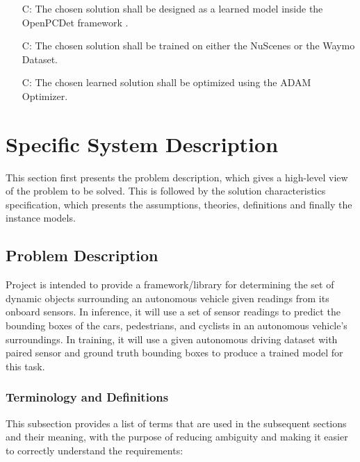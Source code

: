 \documentclass[12pt]{article}
\newcounter{consnum} %
\begin{document}
\noindent \begin{itemize}
\item[C\refstepcounter{consnum}\theconsnum\label{C1}:] The chosen solution shall be designed as a learned model inside the OpenPCDet framework \cite{openpcdet2020}. 

\item[C\refstepcounter{consnum}\theconsnum\label{C2}:] The chosen solution shall be trained on either the NuScenes \cite{caesar2020nuscenes} or the Waymo \cite{sun2020scalability} Dataset.

\item[C\refstepcounter{consnum}\theconsnum\label{C3}:] The chosen learned solution shall be optimized using the ADAM Optimizer.
\end{itemize}
  
 
\section{Specific System Description}

This section first presents the problem description, which gives a high-level
view of the problem to be solved.  This is followed by the solution characteristics
specification, which presents the assumptions, theories, definitions and finally
the instance models.

\subsection{Problem Description} \label{Sec_pd}
Project is intended to provide a framework/library for determining the set of dynamic objects 
surrounding an autonomous vehicle given readings from its onboard sensors. In inference,
it will use a set of sensor readings to predict the bounding boxes of the cars, pedestrians,
and cyclists in an autonomous vehicle's surroundings. In training, it will use a given autonomous
driving dataset with paired sensor and ground truth bounding boxes to produce a trained model
for this task.


\subsubsection{Terminology and  Definitions}

This subsection provides a list of terms that are used in the subsequent
sections and their meaning, with the purpose of reducing ambiguity and making it
easier to correctly understand the requirements:
\end{document}
